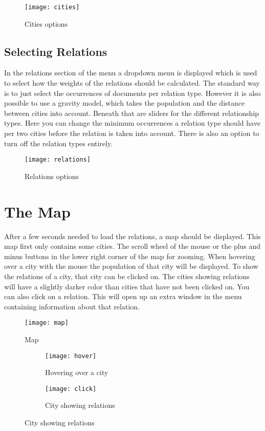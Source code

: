 \begin{figure}[H]
    \centering
    \texttt{[image: cities]}
    \caption{Cities options}
    \label{fig:infoflow}
\end{figure}


\subsection{Selecting Relations}
In the relations section of the menu a dropdown menu is displayed which is used to select how the weights of the relations should be calculated. The standard way is to just select the occurrences of documents per relation type. However it is also possible to use a gravity model, which takes the population and the distance between cities into account.  Beneath that are sliders for the different relationship types. Here you can change the minimum occurrences a relation type should have per two cities before the relation is taken into account. There is also an option to turn off the relation types entirely.

\begin{figure}[H]
    \centering
    \texttt{[image: relations]}
    \caption{Relations options}
    \label{fig:infoflow}
\end{figure}


\section{The Map}
After a few seconds needed to load the relations, a map should be displayed. This map first only contains some cities. The scroll wheel of the mouse or the plus and minus buttons in the lower right corner of the map for zooming. When hovering over a city with the mouse the population of that city will be displayed. To show the relations of a city, that city can be clicked on. The cities showing relations will have a slightly darker color than cities that have not been clicked on. You can also click on a relation. This will open up an extra window in the menu containing information about that relation.

\begin{figure}[H]
    \centering
    \texttt{[image: map]}
    \caption{Map}
    \label{fig:infoflow}
\end{figure}


\begin{figure}[H]
\centering
\begin{subfigure}{.5\textwidth}
  \centering
  \texttt{[image: hover]}
  \caption{Hovering over a city}
  \label{fig:sub1}
\end{subfigure}%
\begin{subfigure}{.5\textwidth}
  \centering
  \texttt{[image: click]}
  \caption{City showing relations}
  \label{fig:sub2}
\end{subfigure}
\label{fig:test}
\end{figure}


